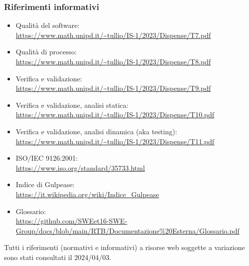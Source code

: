 \subsubsection{Riferimenti informativi}
\begin{itemize}
    \item Qualità del software: \\
    \url{https://www.math.unipd.it/~tullio/IS-1/2023/Dispense/T7.pdf}
    \item Qualità di processo:\\
    \url{https://www.math.unipd.it/~tullio/IS-1/2023/Dispense/T8.pdf}
    \item Verifica e validazione: \\
    \url{https://www.math.unipd.it/~tullio/IS-1/2023/Dispense/T9.pdf}
    \item Verifica e validazione, analisi statica:\\
    \url{https://www.math.unipd.it/~tullio/IS-1/2023/Dispense/T10.pdf}
    \item Verifica e validazione, analisi dinamica (aka testing): \\
    \url{https://www.math.unipd.it/~tullio/IS-1/2023/Dispense/T11.pdf}
    \item ISO/IEC 9126:2001: \\
    \url{https://www.iso.org/standard/35733.html}
    \item Indice di Gulpease: \\
    \url{https://it.wikipedia.org/wiki/Indice_Gulpease}
    \item Glossario: \\
    \url{https://github.com/SWEet16-SWE-Group/docs/blob/main/RTB/Documentazione%20Esterna/Glossario.pdf}
\end{itemize}

Tutti i riferimenti (normativi e informativi) a risorse web soggette a variazione sono stati consultati il 2024/04/03.

